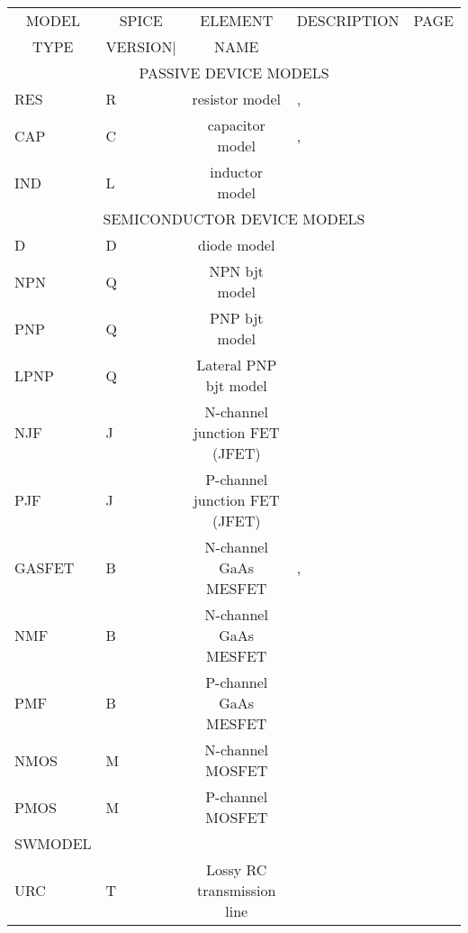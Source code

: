 \begin{center}
\begin{tabular}{|l|l|c|l|l|}
\hline
\multicolumn{1}{|c}{MODEL}&
\multicolumn{1}{|c}{SPICE}&
\multicolumn{1}{|c}{ELEMENT}&
\multicolumn{1}{|c}{DESCRIPTION}&
\multicolumn{1}{|c|}{PAGE}\\
\multicolumn{1}{|c}{TYPE}&
\multicolumn{1}{|c}{VERSION|}& NAME&&\\
\hline \hline
\multicolumn{5}{|c|}{PASSIVE DEVICE MODELS}
\\
\hline
RES \modelversion{}     & R & resistor model    &
   {\pageref{RESmodelsp3},}
   \pageref{RESmodelpspice} \\
CAP \modelversion{}     & C & capacitor model   &
   {\pageref{CAPmodelsp3},}
   \pageref{CAPmodelpspice}
   \\
IND \modelversion{\pspice}  & L & inductor model    &
   \pageref{INDmodelpspice} \\
\hline
\hline
\multicolumn{5}{|c|}{SEMICONDUCTOR DEVICE MODELS}
 \\
\hline
D   \modelversion{} & D & diode model       & \pageref{DIODEmodel} \\
NPN \modelversion{} & Q & NPN bjt model & \pageref{NPNmodel} \\
PNP \modelversion{} & Q & PNP bjt model & \pageref{PNPmodel} \\
LPNP    \modelversion{\pspice}&Q& Lateral PNP bjt model& \pageref{PNPmodel} \\
NJF \modelversion{} & J& N-channel junction FET (JFET)&\pageref{NJFmodel} \\
PJF \modelversion{} & J& P-channel junction FET (JFET)& \pageref{PJFmodel}\\
GASFET  \modelversion{\pspice}&B&N-channel GaAs MESFET&
    {\pageref{GASFETmodelsp3},}
    \pageref{GASFETmodelpspice}
    \\
NMF \modelversion{\spicethree}&B&N-channel GaAs MESFET&\\ %
PMF \modelversion{\spicethree}&B&P-channel GaAs MESFET&\\ 
NMOS    \modelversion{} & M & N-channel MOSFET  & \pageref{NMOSmodel} \\
PMOS    \modelversion{} & M & P-channel MOSFET  & \pageref{PMOSmodel} \\
SWMODEL \modelversion{\spicethree}&&& \pageref{SWMODELmodel} \\
URC \modelversion{\spicethree}& T   &Lossy RC transmission line&

\end{tabular}
\end{center}

